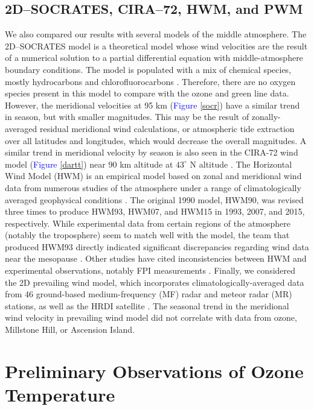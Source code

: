 \documentclass[11pt]{article}
\begin{document}
\subsection{2D--SOCRATES, CIRA--72, HWM, and PWM}
We also compared our results with several models of the middle atmosphere. The 2D--SOCRATES model is a theoretical model whose wind velocities are the result of a numerical solution to a partial differential equation with middle-atmosphere boundary conditions. The model is populated with a mix of chemical species, mostly hydrocarbons and chlorofluorocarbons \cite{Xiao2006}\cite{Brasseur2000}. Therefore, there are no oxygen species present in this model to compare with the ozone and green line data. However, the meridional velocities at 95 km (\textcolor{blue}{Figure} \ref{socr}) have a similar trend in season, but with smaller magnitudes. This may be the result of zonally-averaged residual meridional wind calculations, or atmospheric tide extraction over all latitudes and longitudes, which would decrease the overall magnitudes. A similar trend in meridional velocity by season is also seen in the CIRA-72 wind model (\textcolor{blue}{Figure} \ref{dartt}) near 90 km altitude at $43^\circ$ N altitude \cite{Dartt1983}. The Horizontal Wind Model (HWM) is an empirical model based on zonal and meridional wind data from numerous studies of the atmosphere under a range of climatologically averaged geophysical conditions \cite{Hedin1996}\cite{Drob2008}. The original 1990 model, HWM90, was revised three times to produce HWM93, HWM07, and HWM15 in 1993, 2007, and 2015, respectively. While experimental data from certain regions of the atmosphere (notably the troposphere) seem to match well with the model, the team that produced HWM93 directly indicated significant discrepancies regarding wind data near the mesopause \cite{Hedin1996}. Other studies have cited inconsistencies between HWM and experimental observations, notably FPI measurements \cite{Sandford2010}\cite{Yuan2013}. Finally, we considered the 2D prevailing wind model, which incorporates climatologically-averaged data from 46 ground-based medium-frequency (MF) radar and meteor radar (MR) stations, as well as the HRDI satellite \cite{Portnyagin2004}. The seasonal trend in the meridional wind velocity in prevailing wind model did not correlate with data from ozone, Millstone Hill, or Ascension Island.
\section{Preliminary Observations of Ozone Temperature}
\end{document}
